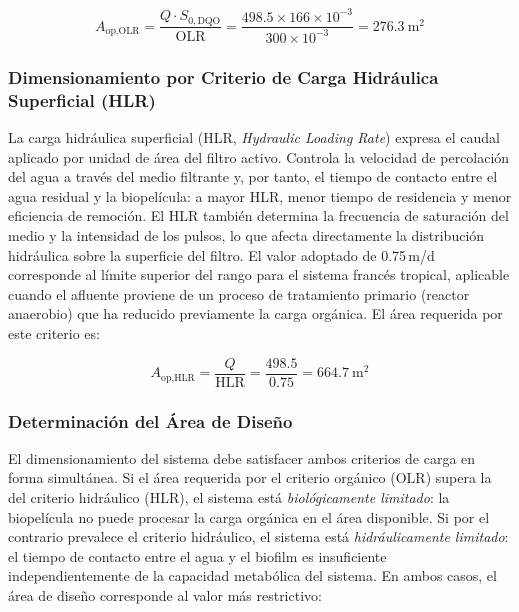 \documentclass[12pt,a4paper]{article}
\begin{document}
\begin{equation}
A_\text{op,OLR} = \frac{Q \cdot S_{0,\text{DQO}}}{\text{OLR}} = \frac{498.5 \times 166 \times 10^{-3}}{300 \times 10^{-3}} = 276.3\ \text{m}^2
\end{equation}

\subsubsection*{Dimensionamiento por Criterio de Carga Hidráulica Superficial (HLR)}

La carga hidráulica superficial (HLR, \textit{Hydraulic Loading Rate}) expresa el caudal aplicado por unidad de área del filtro activo. Controla la velocidad de percolación del agua a través del medio filtrante y, por tanto, el tiempo de contacto entre el agua residual y la biopelícula: a mayor HLR, menor tiempo de residencia y menor eficiencia de remoción. El HLR también determina la frecuencia de saturación del medio y la intensidad de los pulsos, lo que afecta directamente la distribución hidráulica sobre la superficie del filtro. El valor adoptado de 0.75\,m/d corresponde al límite superior del rango para el sistema francés tropical, aplicable cuando el afluente proviene de un proceso de tratamiento primario (reactor anaerobio) que ha reducido previamente la carga orgánica. El área requerida por este criterio es:

\begin{equation}
A_\text{op,HLR} = \frac{Q}{\text{HLR}} = \frac{498.5}{0.75} = 664.7\ \text{m}^2
\end{equation}

\subsubsection*{Determinación del Área de Diseño}

El dimensionamiento del sistema debe satisfacer ambos criterios de carga en forma simultánea. Si el área requerida por el criterio orgánico (OLR) supera la del criterio hidráulico (HLR), el sistema está \textit{biológicamente limitado}: la biopelícula no puede procesar la carga orgánica en el área disponible. Si por el contrario prevalece el criterio hidráulico, el sistema está \textit{hidráulicamente limitado}: el tiempo de contacto entre el agua y el biofilm es insuficiente independientemente de la capacidad metabólica del sistema. En ambos casos, el área de diseño corresponde al valor más restrictivo:
\end{document}
